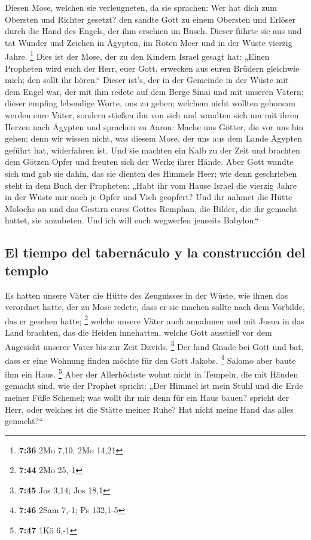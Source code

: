  Diesen Mose, welchen sie verleugneten, da sie sprachen:
Wer hat dich zum Obersten und Richter gesetzt? den sandte Gott zu einem
Obersten und Erlöser durch die Hand des Engels, der ihm erschien im
Busch.  Dieser führte sie aus und tat Wunder und Zeichen
in Ägypten, im Roten Meer und in der Wüste vierzig Jahre. \footnote{\textbf{7:36}
  2Mo 7,10; 2Mo 14,21}  Dies ist der Mose, der zu den
Kindern Israel gesagt hat: „Einen Propheten wird euch der Herr, euer
Gott, erwecken aus euren Brüdern gleichwie mich; den sollt ihr hören.``
 Dieser ist's, der in der Gemeinde in der Wüste mit dem
Engel war, der mit ihm redete auf dem Berge Sinai und mit unseren
Vätern; dieser empfing lebendige Worte, uns zu geben; 
welchem nicht wollten gehorsam werden eure Väter, sondern stießen ihn
von sich und wandten sich um mit ihren Herzen nach Ägypten
 und sprachen zu Aaron: Mache uns Götter, die vor uns hin
gehen; denn wir wissen nicht, was diesem Mose, der uns aus dem Lande
Ägypten geführt hat, widerfahren ist.  Und sie machten
ein Kalb zu der Zeit und brachten dem Götzen Opfer und freuten sich der
Werke ihrer Hände.  Aber Gott wandte sich und gab sie
dahin, das sie dienten des Himmels Heer; wie denn geschrieben steht in
dem Buch der Propheten: „Habt ihr vom Hause Israel die vierzig Jahre in
der Wüste mir auch je Opfer und Vieh geopfert?  Und ihr
nahmet die Hütte Molochs an und das Gestirn eures Gottes Remphan, die
Bilder, die ihr gemacht hattet, sie anzubeten. Und ich will euch
wegwerfen jenseits Babylon.``

\hypertarget{el-tiempo-del-tabernuxe1culo-y-la-construcciuxf3n-del-templo}{%
\subsection{El tiempo del tabernáculo y la construcción del
templo}\label{el-tiempo-del-tabernuxe1culo-y-la-construcciuxf3n-del-templo}}

 Es hatten unsere Väter die Hütte des Zeugnisses in der
Wüste, wie ihnen das verordnet hatte, der zu Mose redete, dass er sie
machen sollte nach dem Vorbilde, das er gesehen hatte; \footnote{\textbf{7:44}
  2Mo 25,-1}  welche unsere Väter auch annahmen und mit
Josua in das Land brachten, das die Heiden innehatten, welche Gott
ausstieß vor dem Angesicht unserer Väter bis zur Zeit Davids.
\footnote{\textbf{7:45} Jos 3,14; Jos 18,1}  Der fand
Gnade bei Gott und bat, dass er eine Wohnung finden möchte für den Gott
Jakobs. \footnote{\textbf{7:46} 2Sam 7,-1; Ps 132,1-5} 
Salomo aber baute ihm ein Haus. \footnote{\textbf{7:47} 1Kö 6,-1}
 Aber der Allerhöchste wohnt nicht in Tempeln, die mit
Händen gemacht sind, wie der Prophet spricht:  „Der
Himmel ist mein Stuhl und die Erde meiner Füße Schemel; was wollt ihr
mir denn für ein Haus bauen? spricht der Herr, oder welches ist die
Stätte meiner Ruhe?  Hat nicht meine Hand das alles
gemacht?{}``

